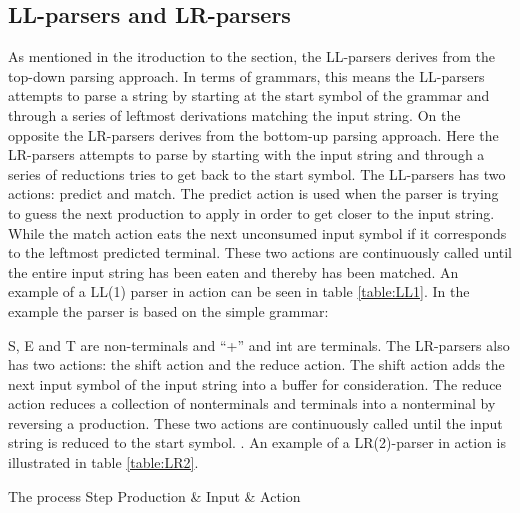 \subsection{LL-parsers and LR-parsers}
\label{subsec:llparsersandlrparsers}
As mentioned in the itroduction to the section, the LL-parsers derives from the top-down parsing approach.
In terms of grammars, this means the LL-parsers attempts to parse a string by starting at the start
symbol of the grammar and through a series of leftmost derivations matching the
input string. On the opposite the LR-parsers derives from the bottom-up parsing
approach. Here the LR-parsers attempts to parse by starting with the input
string and through a series of reductions tries to get back to the start symbol.
The LL-parsers has two actions: predict and match. The predict action is used
when the parser is trying to guess the next production to apply in order to get
closer to the input string. While the match action eats the next unconsumed
input symbol if it corresponds to the leftmost predicted terminal. These two
actions are continuously called until the entire input string has been eaten and
thereby has been matched. An example of a LL(1) parser in action can be seen in
table \ref{table:LL1}. In the example the parser is based on the simple grammar: 

\begin{centering}
\begin{ebnf}
\end{ebnf}
\end{centering}

S, E and T are non-terminals and ``+'' and int are terminals. 
The LR-parsers also has two actions: the shift action and the reduce action. The
shift action adds the next input symbol of the input string into a buffer for
consideration. The reduce action reduces a collection of nonterminals and
terminals into a nonterminal by reversing a production. These two actions are
continuously called until the input string is reduced to the start symbol.
\cite{LL(1)andLR(2)inaction}. An example of a LR(2)-parser in action is
illustrated in table \ref{table:LR2}.

	      {The process                                          }
{Step  	 }{Production & Input       & Action                        }{
}

